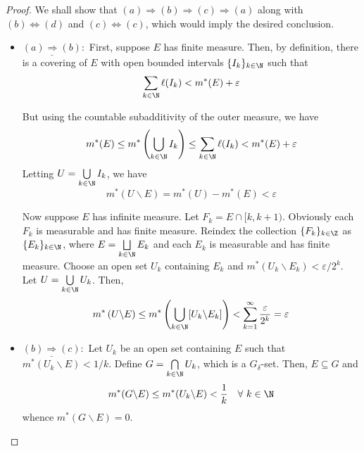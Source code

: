 \begin{proof}
We shall show that $(a)\Longrightarrow (b)\Longrightarrow (c)\Longrightarrow(a)$ along with $(b)\Longleftrightarrow(d)$ and $(c)\Longleftrightarrow(c)$, which would imply the desired conclusion. 

\begin{itemize}
    \item $\underline{(a)\Longrightarrow(b)}:$ First, suppose $E$ has finite measure. Then, by definition, there is a covering of $E$ with open bounded intervals $\{I_k\}_{k\in\N}$ such that 
    \begin{equation*}
        \sum_{k\in\N}\ell(I_k) < m^*(E) + \varepsilon
    \end{equation*}

    But using the countable subadditivity of the outer measure, we have 
    \begin{equation*}
        m^*(E)\le m^*\left(\bigcup_{k\in\N} I_k\right)\le\sum_{k\in\N}\ell(I_k) < m^*(E) + \varepsilon
    \end{equation*}
    Letting $U = \bigcup\limits_{k\in\N} I_k$, we have 
    \begin{equation*}
        m^*(U\backslash E) = m^*(U) - m^*(E) < \varepsilon
    \end{equation*}

    Now suppose $E$ has infinite measure. Let $F_k = E\cap[k, k + 1)$. Obviously each $F_k$ is measurable and has finite measure. Reindex the collection $\{F_k\}_{k\in\Z}$ as $\{E_k\}_{k\in\N}$, where $E = \bigsqcup\limits_{k\in\N} E_k$ and each $E_k$ is measurable and has finite measure. Choose an open set $U_k$ containing $E_k$ and $m^*(U_k\backslash E_k) < \varepsilon/2^k$. Let $U = \bigcup\limits_{k\in\N} U_k$. Then, 
    \begin{equation*}
        m^*\left(U\backslash E\right)\le m^*\left(\bigcup_{k\in\N}[U_k\backslash E_k]\right) < \sum_{k = 1}^\infty\frac{\varepsilon}{2^k} = \varepsilon
    \end{equation*}

    \item $\underline{(b)\Longrightarrow(c)}:$ Let $U_k$ be an open set containing $E$ such that $m^*(U_k\backslash E) < 1/k$. Define $G = \bigcap\limits_{k\in\N} U_k$, which is a $G_\delta$-set. Then, $E\subseteq G$ and 
    \begin{equation*}
        m^*(G\backslash E)\le m^*(U_k\backslash E) < \frac{1}{k}\quad\forall~k\in\N
    \end{equation*}
    whence $m^*(G\backslash E) = 0$.


\end{itemize}
\end{proof}
